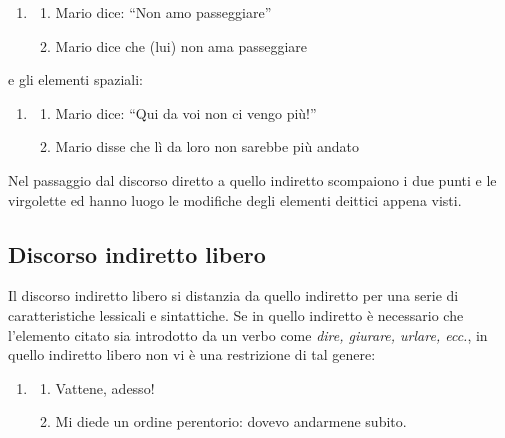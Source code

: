 \documentclass[
  a4paper,
  twoside,
  11pt,
  chapterprefix=false,
  bibliography=totocnumbered,
  listof=flat]{scrbook}
\providecommand{\tightlist}{%
  \setlength{\itemsep}{0pt}\setlength{\parskip}{0pt}}
\begin{document}
\begin{enumerate}
\def\labelenumi{(\arabic{enumi})}
\setcounter{enumi}{154}
\item
  \begin{enumerate}
  \def\labelenumii{\alph{enumii}.}
  \tightlist
  \item
    Mario dice: \enquote{Non amo passeggiare}
  \item
    Mario dice che (lui) non ama passeggiare
  \end{enumerate}
\end{enumerate}

e gli elementi spaziali:

\begin{enumerate}
\def\labelenumi{(\arabic{enumi})}
\setcounter{enumi}{155}
\item
  \begin{enumerate}
  \def\labelenumii{\alph{enumii}.}
  \tightlist
  \item
    Mario dice: \enquote{Qui da voi non ci vengo più!}
  \item
    Mario disse che lì da loro non sarebbe più andato
  \end{enumerate}
\end{enumerate}

Nel passaggio dal discorso diretto a quello indiretto scompaiono i due punti e le virgolette ed hanno luogo le modifiche degli elementi deittici appena visti.

\hypertarget{discorso-indiretto-libero}{%
\subsection{Discorso indiretto libero}\label{discorso-indiretto-libero}}

Il discorso indiretto libero si distanzia da quello indiretto per una serie di caratteristiche lessicali e sintattiche. Se in quello indiretto è necessario che l'elemento citato sia introdotto da un verbo come \emph{dire, giurare, urlare, ecc.}, in quello indiretto libero non vi è una restrizione di tal genere:

\begin{enumerate}
\def\labelenumi{(\arabic{enumi})}
\setcounter{enumi}{156}
\item
  \begin{enumerate}
  \def\labelenumii{\alph{enumii}.}
  \tightlist
  \item
    Vattene, adesso!
  \item
    Mi diede un ordine perentorio: dovevo andarmene subito.
  \end{enumerate}
\end{enumerate}
\end{document}
